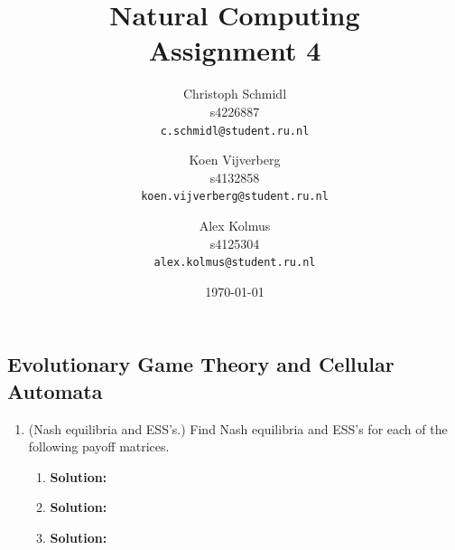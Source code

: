 \documentclass[a4paper]{article}
\title{Natural Computing\\Assignment 4}
\author{
  Christoph Schmidl\\ s4226887\\      \texttt{c.schmidl@student.ru.nl}
  \and
  Koen Vijverberg\\ s4132858\\     \texttt{koen.vijverberg@student.ru.nl}
  \and
  Alex Kolmus\\	s4125304\\	\texttt{alex.kolmus@student.ru.nl}
}
\date{\today}
\begin{document}
\maketitle


\subsection*{Evolutionary Game Theory and Cellular Automata}

\begin{enumerate}

	\item(Nash equilibria and ESS's.) Find Nash equilibria and ESS's for each of the following payoff matrices.
	
	\begin{enumerate}
		\item 
		\begin{minipage}[t]{\linewidth}
          \centering
    \end{minipage}
    \vspace{1em}
		\textbf{Solution:}\\
		
		
		
		\item \begin{minipage}[t]{\linewidth}
          \centering
    \end{minipage}
    \vspace{1em}
		\textbf{Solution:}\\
		
		
		
		
		\item \begin{minipage}[t]{\linewidth}
          \centering
    \end{minipage}
    \vspace{1em}		
        \textbf{Solution:}\\
		

\end{enumerate}
\end{enumerate}
\end{document}

